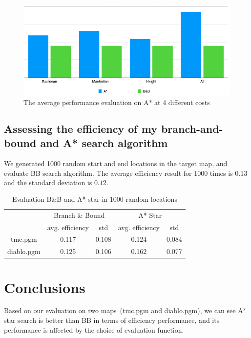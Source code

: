 \documentclass[11pt,oneside]{article}
\begin{document}
 \begin{figure}[H]
\centering
  \includegraphics[scale=0.5]{eval_as_cost.png}
  \caption{The average performance evaluation on A* at 4 different costs}
  \label{fig:eval_as_costs}
 \end{figure}

 
\subsection{Assessing the efficiency of my branch-and-bound and A* search algorithm}
We generated 1000 random start and end locations in the target map, and evaluate BB search algorithm. The average efficiency result for 1000 times is $0.13$ and the standard deviation is $0.12$.

\begin{table}[H]
\begin{tabular}{|c|c|c|c|c|}
\hline
\multirow{2}{*}{} & \multicolumn{2}{c|}{Branch \& Bound} & \multicolumn{2}{c|}{A* Star} \\ \cline{2-5} 
 & avg. efficiency & std & avg. efficiency & std \\ \hline
tmc.pgm & 0.117 & 0.108 & 0.124 & 0.084 \\ \hline
diablo.pgm & 0.125 & 0.106 & 0.162 & 0.077 \\ \hline
\end{tabular}
\caption{Evaluation B\&B and A* star in 1000 random locations}
\label{tab:eval_table}
\end{table}

\section{Conclusions}
Based on our evaluation on two maps~(tmc.pgm and diablo.pgm), we can see A* star search is better than BB in terms of efficiency performance, and its performance is affected by the choice of evaluation function.
\end{document}
